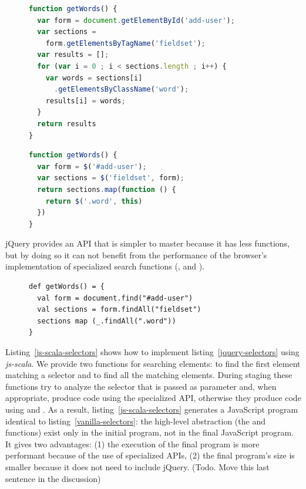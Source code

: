 \documentclass[preprint]{sigplanconf}
\begin{document}
\begin{figure}
\begin{lstlisting}[language=JavaScript,label=vanilla-selectors,caption=Searching elements in plain JavaScript]
function getWords() {
  var form = document.getElementById('add-user');
  var sections =
    form.getElementsByTagName('fieldset');
  var results = [];
  for (var i = 0 ; i < sections.length ; i++) {
    var words = sections[i]
      .getElementsByClassName('word');
    results[i] = words;
  }
  return results
}
\end{lstlisting}
\end{figure}

\begin{figure}
\begin{lstlisting}[language=JavaScript,label=jquery-selectors,caption=Searching elements in jQuery]
function getWords() {
  var form = $('#add-user');
  var sections = $('fieldset', form);
  return sections.map(function () {
    return $('.word', this)
  })
}
\end{lstlisting}
\end{figure}

jQuery provides an API that is simpler to master because it has less functions, but by doing so it can not benefit
from the performance of the browser’s implementation of specialized search functions (,
 and ).

\begin{figure}
\begin{lstlisting}[label=js-scala-selectors,caption=Searching elements in js-scala]
def getWords() = {
  val form = document.find("#add-user")
  val sections = form.findAll("fieldset")
  sections map (_.findAll(".word"))
}
\end{lstlisting}
\end{figure}

Listing~\ref{js-scala-selectors} shows how to implement listing~\ref{jquery-selectors} using \emph{js-scala}. We
provide two functions for searching elements:  to find the first element matching a selector and
 to find all the matching elements. During staging these functions try to analyze the selector that is
passed as parameter and, when appropriate, produce code using the specialized API, otherwise they produce code using
 and . As a result, listing~\ref{js-scala-selectors} generates a
JavaScript program identical to listing~\ref{vanilla-selectors}: the high-level abstraction (the  and
 functions) exist only in the initial program, not in the final JavaScript program. It gives two
advantages: (1) the execution of the final program is more performant because of the use of specialized APIs, (2) the
final program’s size is smaller because it does not need to include jQuery. (Todo. Move this last sentence in the
discussion)
\end{document}
